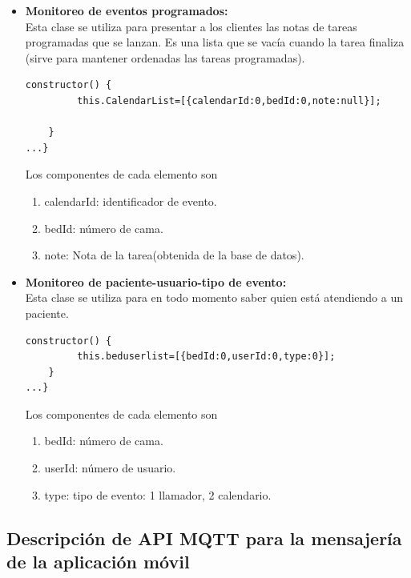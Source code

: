 \begin{itemize}
\item \textbf{ Monitoreo de eventos programados:}\\
Esta clase se utiliza para presentar a los clientes las notas de tareas programadas que se lanzan. Es una lista que se vacía cuando la tarea finaliza (sirve para mantener ordenadas las tareas programadas).

\begin{lstlisting}[caption=  Clase CalendarList]
constructor() {
         this.CalendarList=[{calendarId:0,bedId:0,note:null}];                
        
    }
...}
\end{lstlisting}

Los componentes de cada elemento son 
	\begin{enumerate}
		\item calendarId: identificador de evento.
		\item bedId: número de cama.
		\item note: Nota de la tarea(obtenida de la base de datos).		

	\end{enumerate}




\item \textbf{ Monitoreo de paciente-usuario-tipo de evento:}\\
Esta clase se utiliza para en todo momento saber quien está atendiendo a un paciente.

\begin{lstlisting}[caption=  Clase BedsUserList]
 constructor() {
         this.beduserlist=[{bedId:0,userId:0,type:0}];                        
    }
...}
\end{lstlisting}

Los componentes de cada elemento son 
	\begin{enumerate}
		\item bedId: número de cama.
		\item userId: número de usuario.
		\item type: tipo de evento: 1 llamador, 2 calendario.		

	\end{enumerate}


\end{itemize}
\subsection{Descripción de API MQTT para la mensajería de la aplicación móvil}

